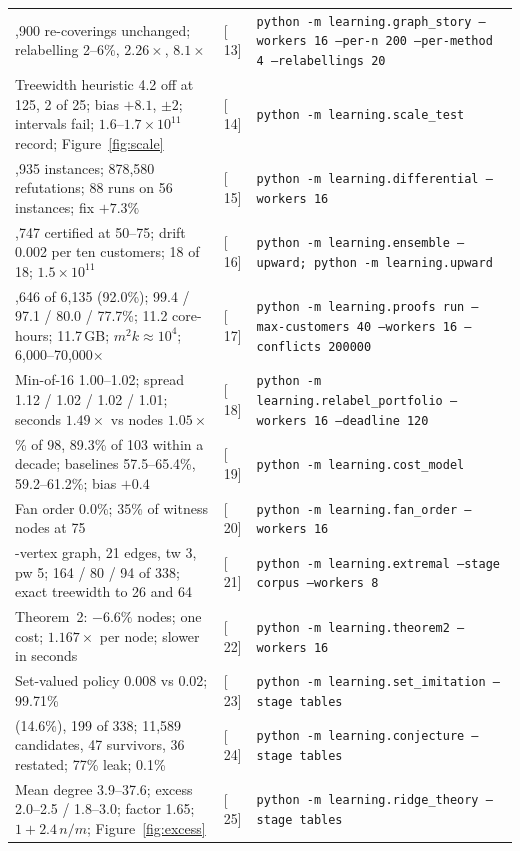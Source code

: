 \documentclass[11pt,a4paper]{article}
\renewcommand{\S}[1]{[\textsection\,#1]}
\newcommand{\code}[1]{\texttt{#1}}
\begin{document}
\begin{longtable}{>{\raggedright\arraybackslash}p{}l>{\raggedright\arraybackslash}p{}}
15,900 re-coverings unchanged; relabelling 2--6\%, $2.26\times$, $8.1\times$ & \S{13} & \code{python -m learning.graph\_story --workers 16 --per-n 200 --per-method 4 --relabellings 20} \\
Treewidth heuristic 4.2 off at 125, 2 of 25; bias $+8.1$, $\pm 2$; intervals fail; $1.6$--$1.7 \times 10^{11}$ record; Figure~\ref{fig:scale} & \S{14} & \code{python -m learning.scale\_test} \\
43,935 instances; 878,580 refutations; 88 runs on 56 instances; fix $+7.3\%$ & \S{15} & \code{python -m learning.differential --workers 16} \\
6,747 certified at 50--75; drift 0.002 per ten customers; 18 of 18; $1.5 \times 10^{11}$ & \S{16} & \code{python -m learning.ensemble --upward; python -m learning.upward} \\
5,646 of 6,135 (92.0\%); 99.4 / 97.1 / 80.0 / 77.7\%; 11.2 core-hours; 11.7\,GB; $m^2 k \approx 10^4$; 6,000--70,000$\times$ & \S{17} & \code{python -m learning.proofs run --max-customers 40 --workers 16 --conflicts 200000} \\
Min-of-16 1.00--1.02; spread 1.12 / 1.02 / 1.02 / 1.01; seconds $1.49\times$ vs nodes $1.05\times$ & \S{18} & \code{python -m learning.relabel\_portfolio --workers 16 --deadline 120} \\
87.8\% of 98, 89.3\% of 103 within a decade; baselines 57.5--65.4\%, 59.2--61.2\%; bias $+0.4$ & \S{19} & \code{python -m learning.cost\_model} \\
Fan order 0.0\%; 35\% of witness nodes at 75 & \S{20} & \code{python -m learning.fan\_order --workers 16} \\
10-vertex graph, 21 edges, tw 3, pw 5; 164 / 80 / 94 of 338; exact treewidth to 26 and 64 & \S{21} & \code{python -m learning.extremal --stage corpus --workers 8} \\
Theorem~2: $-6.6\%$ nodes; one cost; $1.167\times$ per node; slower in seconds & \S{22} & \code{python -m learning.theorem2 --workers 16} \\
Set-valued policy 0.008 vs 0.02; 99.71\% & \S{23} & \code{python -m learning.set\_imitation --stage tables} \\
933 (14.6\%), 199 of 338; 11,589 candidates, 47 survivors, 36 restated; 77\% leak; 0.1\% & \S{24} & \code{python -m learning.conjecture --stage tables} \\
Mean degree 3.9--37.6; excess 2.0--2.5 / 1.8--3.0; factor 1.65; $1 + 2.4\,n/m$; Figure~\ref{fig:excess} & \S{25} & \code{python -m learning.ridge\_theory --stage tables} \\

\end{longtable}
\end{document}
